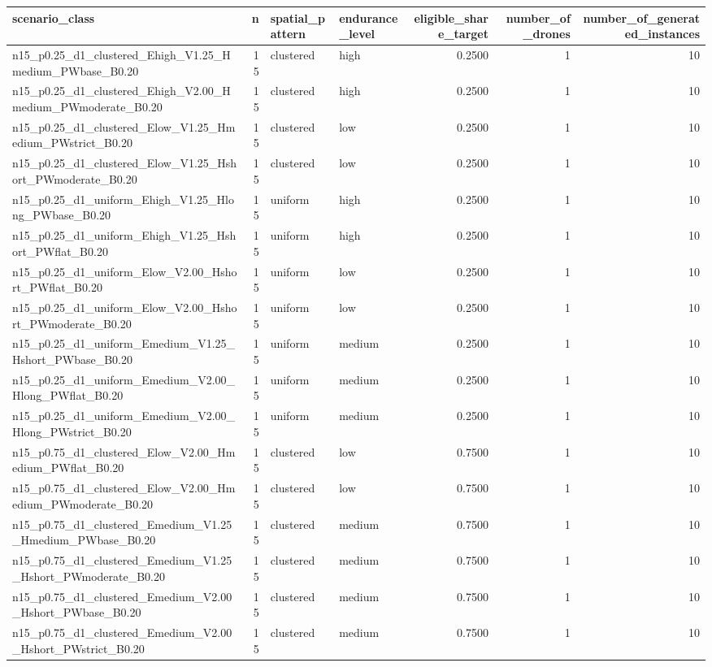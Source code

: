\begin{tabular}{lrllrrr}
\toprule
scenario_class & n & spatial_pattern & endurance_level & eligible_share_target & number_of_drones & number_of_generated_instances \\
\midrule
n15_p0.25_d1_clustered_Ehigh_V1.25_Hmedium_PWbase_B0.20 & 15 & clustered & high & 0.2500 & 1 & 10 \\
n15_p0.25_d1_clustered_Ehigh_V2.00_Hmedium_PWmoderate_B0.20 & 15 & clustered & high & 0.2500 & 1 & 10 \\
n15_p0.25_d1_clustered_Elow_V1.25_Hmedium_PWstrict_B0.20 & 15 & clustered & low & 0.2500 & 1 & 10 \\
n15_p0.25_d1_clustered_Elow_V1.25_Hshort_PWmoderate_B0.20 & 15 & clustered & low & 0.2500 & 1 & 10 \\
n15_p0.25_d1_uniform_Ehigh_V1.25_Hlong_PWbase_B0.20 & 15 & uniform & high & 0.2500 & 1 & 10 \\
n15_p0.25_d1_uniform_Ehigh_V1.25_Hshort_PWflat_B0.20 & 15 & uniform & high & 0.2500 & 1 & 10 \\
n15_p0.25_d1_uniform_Elow_V2.00_Hshort_PWflat_B0.20 & 15 & uniform & low & 0.2500 & 1 & 10 \\
n15_p0.25_d1_uniform_Elow_V2.00_Hshort_PWmoderate_B0.20 & 15 & uniform & low & 0.2500 & 1 & 10 \\
n15_p0.25_d1_uniform_Emedium_V1.25_Hshort_PWbase_B0.20 & 15 & uniform & medium & 0.2500 & 1 & 10 \\
n15_p0.25_d1_uniform_Emedium_V2.00_Hlong_PWflat_B0.20 & 15 & uniform & medium & 0.2500 & 1 & 10 \\
n15_p0.25_d1_uniform_Emedium_V2.00_Hlong_PWstrict_B0.20 & 15 & uniform & medium & 0.2500 & 1 & 10 \\
n15_p0.75_d1_clustered_Elow_V2.00_Hmedium_PWflat_B0.20 & 15 & clustered & low & 0.7500 & 1 & 10 \\
n15_p0.75_d1_clustered_Elow_V2.00_Hmedium_PWmoderate_B0.20 & 15 & clustered & low & 0.7500 & 1 & 10 \\
n15_p0.75_d1_clustered_Emedium_V1.25_Hmedium_PWbase_B0.20 & 15 & clustered & medium & 0.7500 & 1 & 10 \\
n15_p0.75_d1_clustered_Emedium_V1.25_Hshort_PWmoderate_B0.20 & 15 & clustered & medium & 0.7500 & 1 & 10 \\
n15_p0.75_d1_clustered_Emedium_V2.00_Hshort_PWbase_B0.20 & 15 & clustered & medium & 0.7500 & 1 & 10 \\
n15_p0.75_d1_clustered_Emedium_V2.00_Hshort_PWstrict_B0.20 & 15 & clustered & medium & 0.7500 & 1 & 10 \\

\end{tabular}
